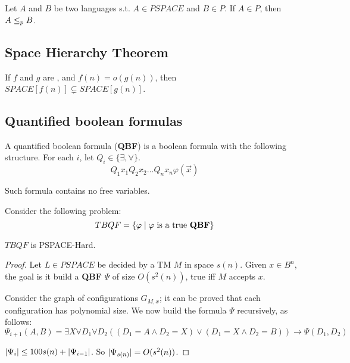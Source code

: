     Let $A$ and $B$ be two languages s.t. $A \in PSPACE$ and $B \in P$. If $A \in P$, then $A \leq_p B$.


\subsection{Space Hierarchy Theorem}\label{subsec:space_def}
    \begin{theorem}\label{thm:space_hierarchy}
        If $f$ and $g$ are , and $f(n) = o(g(n))$, then $SPACE[f(n)] \subsetneq SPACE[g(n)]$.
    \end{theorem}

\subsection{Quantified boolean formulas}\label{subsec:space_quantified_bool_fml}
    \def\QBF{\textbf{QBF}}

    \begin{definition}\label{def:qbf}
        A quantified boolean formula (\QBF) is a boolean formula with the following structure.
        For each $i$, let $Q_i \in \{ \exists, \forall \}$.
        \[ Q_1 x_1 Q_2 x_2 \dots Q_n x_n \varphi(\vec{x}) \]

        Such formula contains no free variables.
    \end{definition}

    Consider the following problem:
    \[ TBQF = \{ \varphi \st \varphi \text{ is a true \QBF} \} \]

    \begin{theorem}\label{thm:tbqf_pspace_hard}
        $TBQF$ is PSPACE-Hard.
    \end{theorem}

    \begin{proof}
        Let $L \in PSPACE$ be decided by a TM $M$ in space $s(n)$.
        Given $x \in B^n$, the goal is it build a \QBF{} $\Psi$ of size $O(s^2(n))$, true iff $M$ accepts $x$.

        Consider the graph of configurations $G_{M,x}$; it can be proved that each configuration has polynomial size.
        We now build the formula $\Psi$ recursively, as follows:
        \[ \Psi_{i+1}(A,B) = \exists X \forall D_1 \forall D_2 ( (D_1 = A \wedge D_2 = X) \vee (D_1=X \wedge D_2=B) ) \rightarrow \Psi(D_1, D_2) \]

        $\vert \Psi_i \vert \leq 100 s(n) + \vert \Psi_{i-1} \vert$. So $\vert \Psi_{s(n)} \vert = O(s^2(n))$.
    \end{proof}

